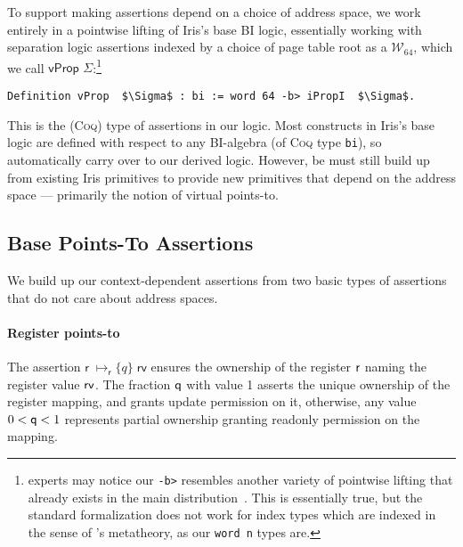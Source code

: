 To support making assertions depend on a choice of address space, we work entirely in a pointwise lifting of Iris's base BI logic,
essentially working with separation logic assertions indexed by a choice of page table root as a $\mathcal{W}_{64}$, which we call $\textsf{vProp }\Sigma$:\footnote{
  \iris experts may notice our \lstinline|-b>| resembles another variety of pointwise lifting that already exists in the main \iris
  distribution~\cite{dang2019rustbelt,dang2022compass}. This is essentially true, but the standard formalization does not work for index types which
  are indexed in the sense of \coq's metatheory, as our \lstinline|word n| types are.
}
\begin{lstlisting}[language=Coq]
  Definition vProp  $\Sigma$ : bi := word 64 -b> iPropI  $\Sigma$.
\end{lstlisting}
This is the (\textsc{Coq}) type of assertions in our logic.
Most constructs in Iris's base logic are defined with respect to any BI-algebra (of \textsc{Coq} type \lstinline|bi|), so automatically
carry over to our derived logic.
However, be must still build up from existing Iris primitives to provide new primitives that depend on the address space --- primarily the notion
of virtual points-to.


\subsection{Base Points-To Assertions}
\label{sec:pointsto}
We build up our context-dependent assertions from two basic types of assertions that do not care about address spaces.

\paragraph{Register points-to} 
The assertion $\textsf{r}\;\mapsto_{\textsf{r}}\{q\}\;\textsf{rv}$ ensures the ownership of the register $\mathsf{r}$ naming the register value $\mathsf{rv}$. 
The fraction $\mathsf{q}$ with value 1 asserts the unique ownership of the register mapping, and grants update permission on it, 
otherwise, any value $0 < \mathsf{q} <1$ represents partial ownership granting readonly permission on the mapping.

